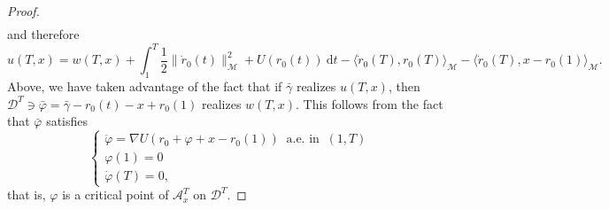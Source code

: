 \documentclass[a4paper,10pt]{amsart}
\newcommand{\ud}{\mathrm{d}}
\theoremstyle{plain}
\theoremstyle{definition}
\numberwithin{equation}{section}
\numberwithin{thm}{section}
\begin{document}
\begin{proof}
\[\begin{split}
 \end{split}
\]
and therefore
\[
u(T,x)= w(T,x) + \int_{1}^{T} \frac{1}{2}\|\dot r_0(t)\|_\mathcal{M}^2 + U(r_0(t))\ \ud t - \langle \dot r_0(T), r_0(T)\rangle_{\mathcal{M}} -\langle\dot{r}_0(T),x-r_0(1)\rangle_\mathcal{M}.
\]
Above, we have taken advantage of the fact that if $\bar\gamma$ realizes $u(T,x)$, then $\mathcal{D}^T \ni \bar\varphi = \bar\gamma-r_0(t)-x+r_0(1)$ realizes $w(T,x)$. This follows from the fact that $\bar\varphi$ satisfies
\[
\begin{cases}
    \ddot\varphi = \nabla U(r_0+\varphi+x-r_0(1)) \ \mbox{ a.e. in } \ (1,T)
    \\
    \varphi(1)=0
    \\
    \dot\varphi(T)=0,
\end{cases}
\]
that is, $\varphi$ is a critical point of $\mathcal{A}_{x}^T$ on $\mathcal{D}^T$.
    \end{proof}
\end{document}
